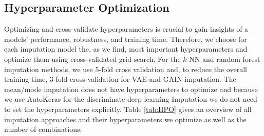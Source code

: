 \subsection{Hyperparameter Optimization}
\label{sec:HPO}
%
Optimizing and cross-validate hyperparameters is crucial to gain insights of a models' performance, robustness, and training time. Therefore, we choose for each imputation model the, as we find, most important hyperparameters and optimize them using cross-validated grid-search. For the $k$-NN and random forest imputation methods, we use $5$-fold cross validation and, to reduce the overall training time, $3$-fold cross validation for VAE and GAIN imputation. The mean/mode imputation does not have hyperparameters to optimize and because we use AutoKeras for the discriminate deep learning Imputation we do not need to set the hyperparameters explicitly. Table \ref{tab:HPO} gives an overview of all imputation approaches and their hyperparameters we optimize as well as the number of combinations.
%
